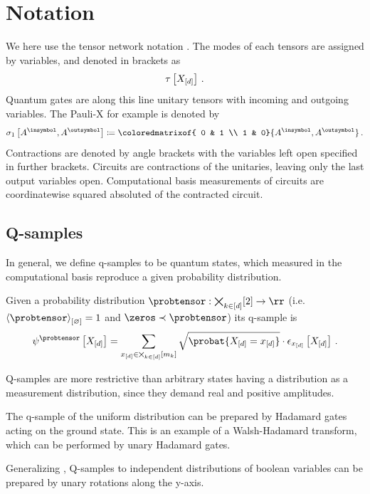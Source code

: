 \section{Notation}

We here use the tensor network notation \cite{goessmann_tensor_2026}.
The modes of each tensors are assigned by variables, and denoted in brackets as
\begin{align*}
    \tau\left[X_{[d]}\right] \, .
\end{align*}
Quantum gates are along this line unitary tensors with incoming and outgoing variables.
The Pauli-X for example is denoted by
\begin{align*}
    \paulixat{\cavariable{\insymbol},\cavariable{\outsymbol}} \coloneqq
    \coloredmatrixof{
        0 & 1 \\
        1 & 0}{\cavariable{\insymbol},\cavariable{\outsymbol}} \, .
\end{align*}
Contractions are denoted by angle brackets with the variables left open specified in further brackets.
Circuits are contractions of the unitaries, leaving only the last output variables open.
Computational basis measurements of circuits are coordinatewise squared absoluted of the contracted circuit.

\subsection{Q-samples}

In general, we define q-samples to be quantum states, which measured in the computational basis reproduce a given probability distribution.

\begin{definition}
    Given a probability distribution $\probtensor:\atomstates\rightarrow\rr$ (i.e. $\contraction{\probtensor}=1$ and $\zeros \prec \probtensor$) its q-sample is
    \begin{align*}
        \qstateofat{\probtensor}{\shortcatvariables}
        = \sum_{\shortcatindicesin} \sqrt{\probat{\indexedshortcatvariables}} \cdot \onehotmapofat{\shortcatindices}{\shortcatvariables} \, .
    \end{align*}
\end{definition}

Q-samples are more restrictive than arbitrary states having a distribution as a measurement distribution, since they demand real and positive amplitudes.

\begin{example}
    \label{exa:qSampleUniform}
    The q-sample of the uniform distribution can be prepared by Hadamard gates acting on the ground state.
    This is an example of a Walsh-Hadamard transform, which can be performed by unary Hadamard gates.
\end{example}

Generalizing , Q-samples to independent distributions of boolean variables can be prepared by unary rotations along the y-axis.

